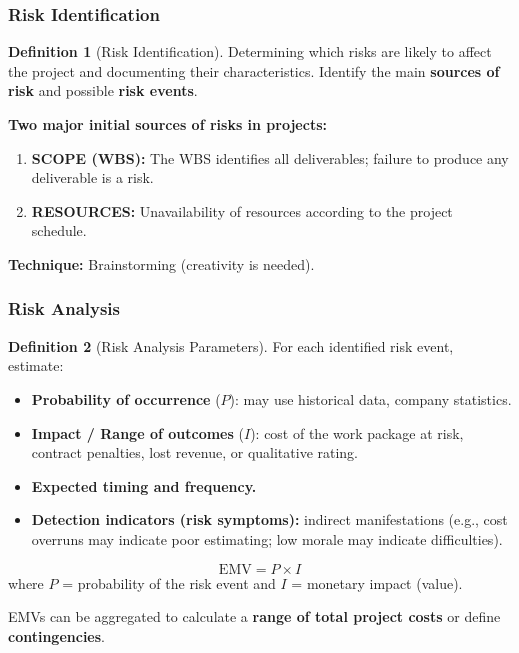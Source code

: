 \documentclass[11pt,a4paper]{article}
\theoremstyle{definition}
\newtheorem{definition}{Definition}[section]
\theoremstyle{plain}
\begin{document}
\subsubsection{Risk Identification}

\begin{definition}[Risk Identification]
Determining which risks are likely to affect the project and documenting their characteristics. Identify the main \textbf{sources of risk} and possible \textbf{risk events}.
\end{definition}

\textbf{Two major initial sources of risks in projects:}
\begin{enumerate}[nosep, label=\arabic*.]
  \item \textbf{SCOPE (WBS):} The WBS identifies all deliverables; failure to produce any deliverable is a risk.
  \item \textbf{RESOURCES:} Unavailability of resources according to the project schedule.
\end{enumerate}

\textbf{Technique:} Brainstorming (creativity is needed).

\subsubsection{Risk Analysis}

\begin{definition}[Risk Analysis Parameters]
For each identified risk event, estimate:
\begin{itemize}[nosep]
  \item \textbf{Probability of occurrence} ($P$): may use historical data, company statistics.
  \item \textbf{Impact / Range of outcomes} ($I$): cost of the work package at risk, contract penalties, lost revenue, or qualitative rating.
  \item \textbf{Expected timing and frequency.}
  \item \textbf{Detection indicators (risk symptoms):} indirect manifestations (e.g., cost overruns may indicate poor estimating; low morale may indicate difficulties).
\end{itemize}
\end{definition}

\begin{formulabox}
\[
  \mathrm{EMV} = P \times I
\]
where $P$ = probability of the risk event and $I$ = monetary impact (value).

EMVs can be aggregated to calculate a \textbf{range of total project costs} or define \textbf{contingencies}.
\end{formulabox}
\end{document}
